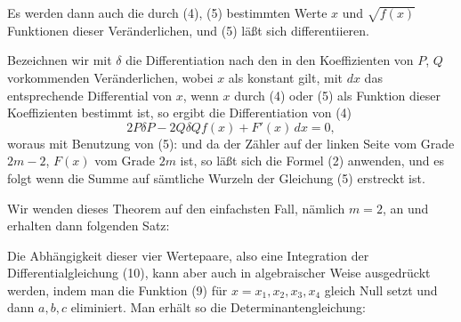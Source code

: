 
Es werden dann auch die durch (4), (5) bestimmten Werte $x$
und $\sqrt{f(x)}$ Funktionen dieser Veränderlichen, und (5) läßt sich
differentiieren.

Bezeichnen wir mit $\delta$ die Differentiation nach den in den
Koeffizienten von $P$, $Q$ vorkommenden Veränderlichen, wobei $x$
als konstant gilt, mit $dx$ das entsprechende Differential von $x$,
wenn $x$ durch (4) oder (5) als Funktion dieser Koeffizienten
bestimmt ist, so ergibt die Differentiation von (4)
\[ 2P\delta P - 2Q\delta Qf(x) + F'(x)\,dx = 0, \]
woraus mit Benutzung von (5):
und da der Zähler auf der linken Seite vom Grade $2m-2$,
$F(x)$ vom Grade $2m$ ist, so läßt sich die Formel (2) anwenden,
und es folgt
wenn die Summe auf sämtliche Wurzeln der Gleichung (5) erstreckt
 ist.

Wir wenden dieses Theorem auf den einfachsten Fall, nämlich
 $m=2$, an und erhalten dann folgenden Satz:


Die Abhängigkeit dieser vier Wertepaare, also eine Integration
 der Differentialgleichung (10), kann aber auch in algebraischer
 Weise ausgedrückt werden, indem man die Funktion
(9) für $x = x_1, x_2, x_3, x_4$ gleich Null setzt und dann $a, b, c$
eliminiert. Man erhält so die Determinantengleichung:
